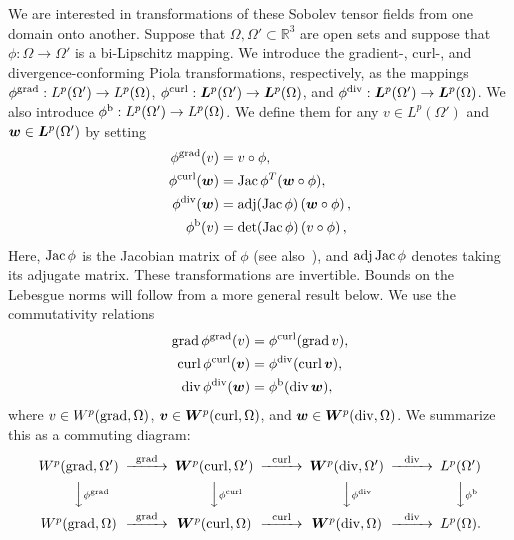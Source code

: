 \documentclass[10pt,a4paper]{article}
\newcommand{\mwl}[1]{{\color{red}#1}}
\begin{document}
We are interested in transformations of these Sobolev tensor fields from one domain onto another. 
Suppose that $\Omega, \Omega' \subset \mathbb{R}^3$ are open sets and suppose that $\phi: \Omega \to \Omega'$ is a bi-Lipschitz mapping.
\mwl{We introduce the} gradient-, curl-, and divergence-conforming Piola transformations, respectively, as the mappings 
$\phi^{\operatorname{grad}}: L^{p}(\Omega') \to L^{p}(\Omega)$,
$\phi^{\operatorname{curl}}: \bm{L}^{p}(\Omega') \to \bm{L}^{p}(\Omega)$, and 
$\phi^{\operatorname{div}}: \bm{L}^{p}(\Omega') \to \bm{L}^{p}(\Omega)$.
We also introduce 
$\phi^{\rm b}: L^{p}(\Omega') \to L^{p}(\Omega)$. 
We define them 
for any $v \in L^{p}(\Omega')$ and $\bm{w} \in \bm{L}^{p}(\Omega')$ by setting 
\begin{subequations}\label{eq_definition_piola}
\begin{align*}
    \phi^{\operatorname{grad}}(v) &= v \circ \phi, \\
    \phi^{\operatorname{curl}}(\bm{w}) &= \operatorname{{\rm Jac}}\phi^{T} (\bm{w} \circ \phi), \\
    \phi^{\operatorname{div}}(\bm{w}) &= \operatorname{adj}(\operatorname{{\rm Jac}}\phi) \left( \bm{w} \circ \phi \right), \\  
    \phi^{\rm b}(v) &= \det(\operatorname{{\rm Jac}}\phi) \left( v \circ \phi \right),
\end{align*}
\end{subequations}
Here, $\operatorname{{\rm Jac}}\phi$ is the Jacobian matrix of $\phi$ (see also~\cite[Definition~9.8]{ern2021finite}), and $\operatorname{adj}\operatorname{{\rm Jac}}\phi$ denotes taking its adjugate matrix.
These transformations are invertible. 
Bounds on the Lebesgue norms will follow from a more general result below. 
We use the commutativity relations 
\begin{subequations}\label{eq_piola_commute}
\begin{align}
    \operatorname{grad} \phi^{\operatorname{grad}} (v) &= \phi^{\operatorname{curl}}(\operatorname{grad} v), 
    \\
    \operatorname{curl} \phi^{\operatorname{curl}}(\bm{v}) &= \phi^{\operatorname{div}}(\operatorname{curl} \bm{v}), 
    \\
    \operatorname{div} \phi^{\operatorname{div}}(\bm{w}) &= \phi^{\rm b}(\operatorname{div} \bm{w}),
\end{align}
\end{subequations}
where $v \in W^{p}(\operatorname{grad},\Omega)$, $\bm{v} \in \bm{W}^{p}(\operatorname{curl},\Omega)$, and $\bm{w} \in \bm{W}^{p}(\operatorname{div},\Omega)$.  
We summarize this as a commuting diagram:
\begin{align*}
    \begin{CD}
        W^{p}(\grad,\Omega') @>{\grad}>> \bfW^{p}(\curl,\Omega') @>{\curl}>> \bfW^{p}(\divergence,\Omega') @>{\divergence}>> L^{p}(\Omega')
        \\
        @VV{\phi^{\grad}}V 
        @VV{\phi^{\curl}}V 
        @VV{\phi^{\divergence}}V 
        @VV{\phi^{\rm b}}V 
        \\
        W^{p}(\grad,\Omega ) @>{\grad}>> \bfW^{p}(\curl,\Omega ) @>{\curl}>> \bfW^{p}(\divergence,\Omega ) @>{\divergence}>> L^{p}(\Omega ).
    \end{CD}
\end{align*}
\end{document}

